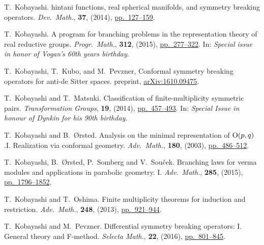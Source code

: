 \documentclass[reqno,12pt]{pja00} %
\theoremstyle{definition}
\theoremstyle{exampstyle} \newtheorem{examp}[theorem]{Theorem}
\begin{document}
\begin{thebibliography}{14}
T.~Kobayashi.
hintani functions, real spherical manifolds, and
  symmetry breaking operators.
  \newblock \emph{{\normalfont Dev.~Math.}}, \textbf{37}, (2014),
 \href{http://dx.doi.org/10.4171/OWR/2014/3}{pp.~127--159}.

T.~Kobayashi.
\newblock A program for branching problems in the representation theory of real
  reductive groups.
\newblock \emph{{\normalfont Progr.~Math.}}, \textbf{312}, (2015), 
\href{http://dx.doi.org/10.1007/978-3-319-23443-4_10}{pp.~277--322}.
\newblock In: \emph{{\normalfont Special issue in honor of Vogan's 60th years
  birthday}}.

T.~Kobayashi, T.~Kubo, and M.~Pevzner,
\newblock 
Conformal symmetry breaking operators for anti-de Sitter spaces.
preprint, 
\href{https://arxiv.org/abs/1610.09475}{arXiv:1610.09475}.

T.~Kobayashi and T.~Matsuki.
\newblock Classification of finite-multiplicity symmetric pairs.
\newblock \emph{{\normalfont Transformation Groups}}, \textbf{19}, (2014),
\href{http://dx.doi.org/10.1007/s00031-014-9265-x}{pp.~457--493}.
\newblock In: \emph{{\normalfont Special Issue in honour of Dynkin
  for his 90th birthday}}.


T.~Kobayashi and B.~{\O}rsted.
\newblock Analysis on the minimal representation of\/ {${\rm
  O}(p,q)$}.{\;}{{\rm{I}}. Realization via conformal geometry}.
\newblock \emph{\normalfont Adv.~Math.}, \textbf{180}, (2003),
\href{http://dx.doi.org/10.1016/S0001-8708(03)00012-4}{pp.~486--512}.

T.~Kobayashi, B.~{\O}rsted, P.~Somberg and V.~Sou{\v{c}}ek.
\newblock Branching laws for verma modules and applications in parabolic
  geometry. {I}.
\newblock \emph{{\normalfont Adv.~Math.}}, \textbf{285}, (2015),
\href{http://dx.doi.org/10.1016/j.aim.2015.08.020}{pp.~1796--1852}.

T.~Kobayashi and T.~Oshima.
\newblock Finite multiplicity theorems for induction and restriction.
\newblock \emph{{\normalfont Adv.~Math.}}, \textbf{248}, (2013), 
 \href{http://dx.doi.org/10.1016/j.aim.2013.07.015}{pp.~921--944}.

T.~Kobayashi and M.~Pevzner.
\newblock Differential symmetry breaking operators: I. {G}eneral theory and
  {F}-method.
\newblock \emph{{\normalfont Selecta Math.}}, \textbf{22}, (2016),
\href{http://dx.doi.org/10.1007/s00029-015-0207-9}{pp.~801--845}.


\end{thebibliography}
\end{document}
